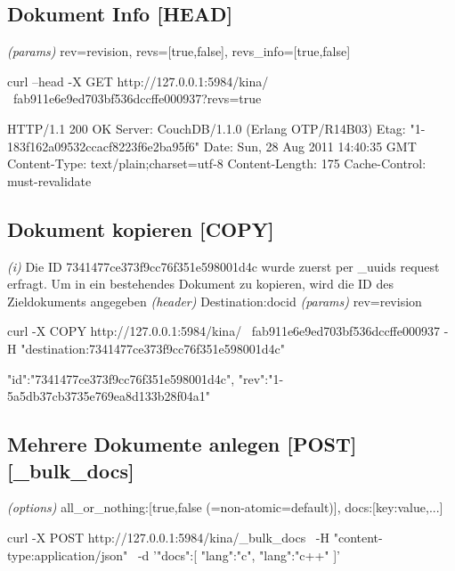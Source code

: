 \documentclass[19pt,landscape,twocolumn]{article}
\newcommand{\htmlverb}[1]{{[}\textbf{{#1}}{]}}
\newcommand{\brackets}[1]{{[}{#1}{]}}
\newcommand{\setparskip}{\setlength{\parskip}{-6mm}}
\newcommand{\resetparskip}{\setlength{\parskip}{1mm}}
\begin{document}
\subsection{Dokument Info \htmlverb{HEAD}}
\emph{(params)} rev=revision, revs=\brackets{true,false}, revs\_info=\brackets{true,false} 

\begin{code}
curl --head -X GET http://127.0.0.1:5984/kina/ \
  fab911e6e9ed703bf536dccffe000937?revs=true
\end{code}
\setparskip
\begin{response}
HTTP/1.1 200 OK
Server: CouchDB/1.1.0 (Erlang OTP/R14B03)
Etag: "1-183f162a09532ccacf8223f6e2ba95f6"
Date: Sun, 28 Aug 2011 14:40:35 GMT
Content-Type: text/plain;charset=utf-8
Content-Length: 175
Cache-Control: must-revalidate
\end{response}
\resetparskip

\subsection{Dokument kopieren \htmlverb{COPY}}
\emph{(i)} Die ID 7341477ce373f9cc76f351e598001d4c wurde zuerst per \_uuids request \newline
erfragt. Um in ein bestehendes Dokument zu kopieren, wird die ID des Zieldokuments angegeben
\emph{(header)} Destination:docid \newline
\emph{(params)} rev=revision

\begin{code}
curl -X COPY http://127.0.0.1:5984/kina/ \
  fab911e6e9ed703bf536dccffe000937 
  -H "destination:7341477ce373f9cc76f351e598001d4c"
\end{code}
\setparskip
\begin{response}
{"id":"7341477ce373f9cc76f351e598001d4c",
 "rev":"1-5a5db37cb3735e769ea8d133b28f04a1"}
\end{response}
\resetparskip

\subsection{Mehrere Dokumente anlegen \htmlverb{POST} \htmlverb{\_bulk\_docs}}
\emph{(options)} all\_or\_nothing:\brackets{true,false (=non-atomic=default)}, docs:\brackets{key:value,...}

\begin{code}
curl -X POST http://127.0.0.1:5984/kina/_bulk_docs \
  -H "content-type:application/json" \
  -d '{"docs":[
        {"lang":"c"}, 
        {"lang":"c++"}
     ]}'
\end{code}
\setparskip
\begin{response}
\end{response}
\resetparskip
\end{document}
